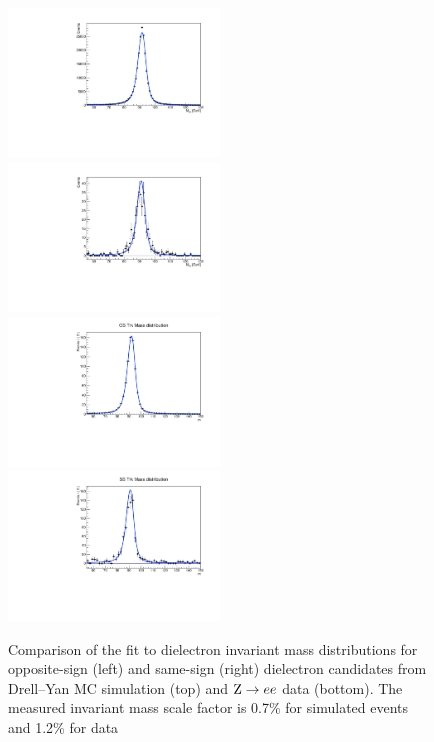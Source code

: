 \begin{figure}
  \includegraphics[width=0.5\textwidth]{4_Analisys/pics/8TeV/fakerate_fits/charge_flip_prob_map_eid12Medium_h2taucutsos_trkMass.pdf}
  \includegraphics[width=0.5\textwidth]{4_Analisys/pics/8TeV//fakerate_fits/charge_flip_prob_map_eid12Medium_h2taucutsss_trkMass.pdf} \\
  \includegraphics[width=0.5\textwidth]{4_Analisys/pics/8TeV/fakerate_fits/charge_flip_prob_map_dataos_trkMass.pdf}
  \includegraphics[width=0.5\textwidth]{4_Analisys/pics/8TeV//fakerate_fits/charge_flip_prob_map_datass_trkMass.pdf} \\  
  \caption{
  Comparison of the fit to dielectron invariant mass distributions for opposite-sign (left) and same-sign (right) dielectron candidates from Drell--Yan MC simulation (top) and $\mathrm{Z}\rightarrow ee$ data (bottom). The measured invariant mass scale factor is 0.7\% for simulated events and 1.2\% for data}
  \label{fig:ee_invMass_fit}
\end{figure}


